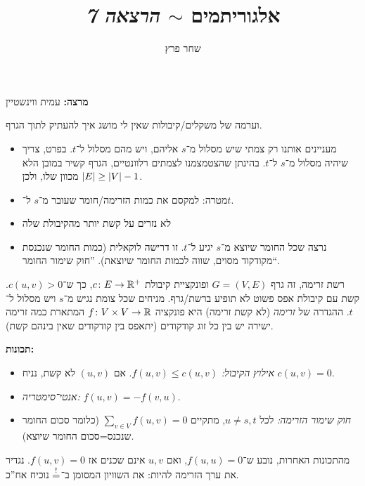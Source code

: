 \documentclass[]{../../../../tex/classes/styledArticle}
\author{שחר פרץ}
\title{אלגוריתמים $\sim$ \textit{הרצאה 7}}
\begin{document}
	\maketitle
	\textbf{מרצה: }עמית ווינשטיין
	
	
	\begin{center}
		\sen
		\she
	\end{center}
	וערמה של משקלים/קיבולות שאין לי מושג איך להעתיק לתוך הגרף. 
	\begin{itemize}
		\item מעניינים אותנו רק צמתי שיש מסלול מ־$s$ אליהם, ויש מהם מסלול ל־$t$. בפרט, צריך שיהיה מסלול מ־$s$ ל־$t$. בהינתן שהצטמצמנו לצמתים רלוונטיים, הגרף קשיר במובן הלא מכוון שלו, ולכן $\left \lvert E \right \rvert \ge \left \lvert V \right \rvert - 1$. 
		\item מטרה: למקסם את כמות הזרימה/חומר שעובר מ־$s$ ל־$t$. 
		\item לא נזרים על קשת יותר מהקיבולת שלה
		\item נרצה שכל החומר שיוצא מ־$s$ יגיע ל־$t$. זו דרישה לוקאלית (כמות החומר שנכנסת מקודקוד מסוים, שווה לכמות החומר שיוצאת). ''חוק שימור החומר``. 
	\end{itemize}
	
	רשת זרימה, זה גרף $G = (V, E)$ ופונקציית קיבולת $c \colon E \to \mathbb{R}^{+}$, כך ש־$c(u, v) > 0$. קשת עם קיבולת אפס פשוט לא תופיע ברשת/גרף. מניחים שכל צומת נגיש מ־$s$ ויש מסלול ל־$t$. ההגדרה של \textit{זרימה} (לא קשת זרימה) היא פונקציה $f \colon V \times V \to \mathbb{R}$ המתארת כמה זרימה ישירה יש בין כל זוג קודקודים (יתאפס בין קודקודים שאין בינהם קשת). 
	
	\textbf{תכונות: }
	\begin{itemize}
		\item \textit{אילוץ הקיבול: }$f(u, v) \le c(u, v)$. אם $(u, v)$ לא קשת, נניח $c(u, v) = 0$. 
		\item \textit{אנטי־סימטריה: }$f(u, v) = -f(v, u)$. 
		\item \textit{חוק שימור הזרימה: }לכל $u \neq s, t$, מתקיים $\sum_{v \in V} f(u, v) = 0$ (כלומר סכום החומר שנכנס=סכום החומר שיוצא). 
	\end{itemize}
	מהתכונות האחרות, נובע ש־$f(u, u) = 0$, ואם $u, v$ אינם שכנים אז $f(u, v) = 0$. 
	נגדיר את ערך הזרימה להיות: 
	את השוויון המסומן ב־$\overset{!}{=}$ נוכיח אח''כ. 
	
\end{document}
